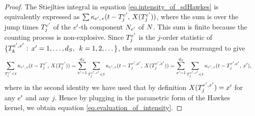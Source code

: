\documentclass[10pt, article,table]{article}
\begin{document}
\begin{proof}
 The Stiejlties integral in equation \eqref{eq.intensity_of_sdHawkes} is equivalently expressed as $\sum \hawkesKernel\subscriptee (t-\arrivalTimes[\eone]_j, \, X(\arrivalTimes[\eone]_j) )$, where the sum is over the jump times $\arrivalTimes[\eone]_j$ of the $\eone$-th component $\countingProc[\eone]$ of $\multiCountingProc$. This sum is finite because the counting process is non-explosive. Since $\arrivalTimes[\eone]_j$ is the $j$-order statistic of $\lbrace \arrivalTimes[\eone,\xone]_k: \, \xone=1,\dots,\numStates, \,\,\, k=1,2,\dots\rbrace$, the summands can be rearranged to give 
 \begin{equation*}
  \sum_{\arrivalTimes[\eone]_j < t} \hawkesKernel\subscriptee (t-\arrivalTimes[\eone]_j, \, X(\arrivalTimes[\eone]_j))
  = \sum_{\xone=1}^{\numStates} \sum_{\arrivalTimes[\eone, \xone]_j < t} \hawkesKernel\subscriptee (t-\arrivalTimes[\eone, \xone]_j, \, X(\arrivalTimes[\eone,\xone]_j))
  = \sum_{\xone=1}^{\numStates} \sum_{\arrivalTimes[\eone, \xone]_j < t} \hawkesKernel\subscriptee (t-\arrivalTimes[\eone, \xone]_j, \, \xone),
 \end{equation*}
where in the second identity we have used that by definition $X(\arrivalTimes[\eone,\xone]_j) = \xone$ for any $\eone$ and any $j$. Hence by plugging in the parametric form of the Hawkes kernel, we obtain equation \eqref{eq.evaluation_of_intensity}. 


\end{proof}
\end{document}
